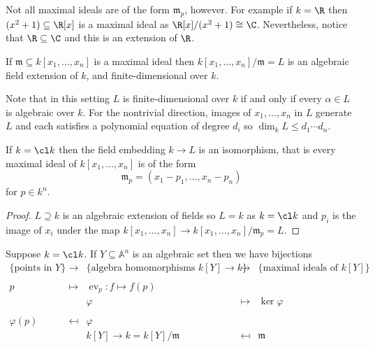 \documentclass[a4paper]{article}
\renewcommand{\A}{\mathbb{A}}
\DeclareMathOperator{\ev}{ev}
\begin{document}
Not all maximal ideals are of the form \(\mathfrak m_p\), however. For example if \(k = \R\) then \((x^2 + 1) \subseteq \R[x]\) is a maximal ideal as \(\R[x]/(x^2 + 1) \cong \C\). Nevertheless, notice that \(\R \subseteq \C\) and this is an extension of \(\R\).

\begin{theorem}[Nullstellensatz]\leavevmode
  \label{thm:Nullstellensatz}
  If \(\mathfrak m \subseteq k[x_1, \dots, x_n]\) is a maximal ideal then \(k[x_1, \dots, x_n]/\mathfrak m = L\) is an algebraic field extension of \(k\), and finite-dimensional over \(k\).
\end{theorem}

Note that in this setting \(L\) is finite-dimensional over \(k\) if and only if every \(\alpha \in L\) is algebraic over \(k\). For the nontrivial direction, images of \(x_1, \dots, x_n\) in \(L\) generate \(L\) and each satisfies a polynomial equation of degree \(d_i\) so \(\dim_k L \leq d_1 \cdots d_n\).

\begin{corollary}
  If \(k = \cl k\) then the field embedding \(k \to L\) is an isomorphism, that is every maximal ideal of \(k[x_1, \dots, x_n]\) is of the form
  \[
    \mathfrak m_p = (x_1 - p_1, \dots, x_n - p_n)
  \]
  for \(p \in k^n\).
\end{corollary}

\begin{proof}
  \(L \supseteq k\) is an algebraic extension of fields so \(L = k\) as \(k = \cl k\) and \(p_i\) is the image of \(x_i\) under the map \(k[x_1, \dots, x_n] \to k[x_1, \dots, x_n]/\mathfrak m_p = L\).
\end{proof}

\begin{corollary}
  Suppose \(k = \cl k\). If \(Y \subseteq \A^n\) is an algebraic set then we have bijections
  \[
    \begin{array}{ccccc}
      \{\text{points in } Y\} & \to & \{\text{algebra homomorphisms } k[Y] \to k\} & \to & \{\text{maximal ideals of } k[Y]\} \\
      \\
      p & \mapsto & \ev_p:f \mapsto f(p) \\
                              & & \varphi & \mapsto & \ker \varphi \\
      \\
      \varphi(p) & \mapsfrom & \varphi \\
      & & k[Y] \to k = k[Y]/\mathfrak m & \mapsfrom & \mathfrak m
    \end{array}
  \]
\end{corollary}
\end{document}
